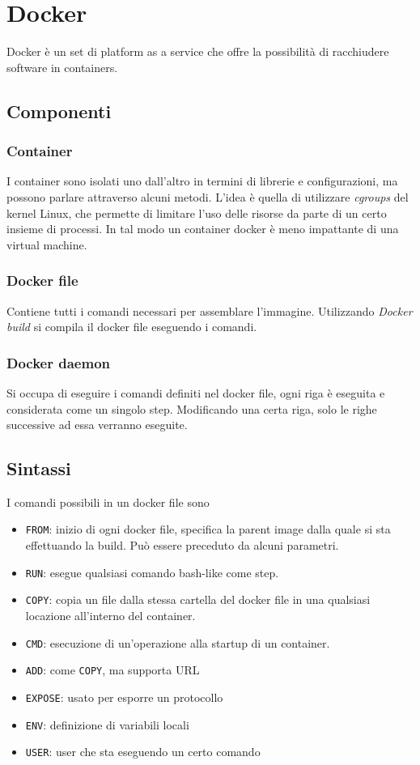 \section{Docker}
Docker è un set di platform as a service che offre la possibilità di 
racchiudere software in containers. 

\subsection{Componenti}

\subsubsection{Container}
I container sono isolati uno dall'altro in termini di librerie e configurazioni, 
ma possono parlare attraverso alcuni metodi.
L'idea è quella di utilizzare \emph{cgroups} del kernel Linux, che permette
di limitare l'uso delle risorse da parte di un certo insieme di processi.
In tal modo un container docker è meno impattante di una virtual machine.

\subsubsection{Docker file}
Contiene tutti i comandi necessari per assemblare l'immagine.
Utilizzando \emph{Docker build} si compila il docker file eseguendo i comandi.

\subsubsection{Docker daemon} 
Si occupa di eseguire i comandi definiti nel docker file, ogni riga è eseguita
e considerata come un singolo step.
Modificando una certa riga, solo le righe successive ad essa verranno eseguite.

\subsection{Sintassi}
I comandi possibili in un docker file sono
\begin{itemize}
    \item \texttt{FROM}: inizio di ogni docker file, specifica la parent image dalla quale si sta effettuando 
    la build. Può essere preceduto da alcuni parametri.
    \item \texttt{RUN}: esegue qualsiasi comando bash-like come step.
    \item \texttt{COPY}: copia un file dalla stessa cartella del docker file in una qualsiasi locazione 
    all'interno del container.
    \item \texttt{CMD}: esecuzione di un'operazione alla startup di un container.
    \item \texttt{ADD}: come \texttt{COPY}, ma supporta URL
    \item \texttt{EXPOSE}: usato per esporre un protocollo
    \item \texttt{ENV}: definizione di variabili locali 
    \item \texttt{USER}: user che sta eseguendo un certo comando
\end{itemize}

